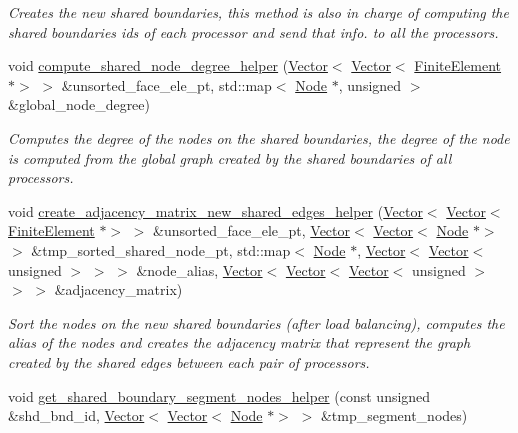 \begin{DoxyCompactItemize}
\begin{DoxyCompactList}\small\item\em Creates the new shared boundaries, this method is also in charge of computing the shared boundaries ids of each processor and send that info. to all the processors. \end{DoxyCompactList}\item 
void \hyperlink{classoomph_1_1RefineableTriangleMesh_a4c2c3ff989c57ac84bbc9a8b5fb1db26}{compute\+\_\+shared\+\_\+node\+\_\+degree\+\_\+helper} (\hyperlink{classoomph_1_1Vector}{Vector}$<$ \hyperlink{classoomph_1_1Vector}{Vector}$<$ \hyperlink{classoomph_1_1FiniteElement}{Finite\+Element} $\ast$$>$ $>$ \&unsorted\+\_\+face\+\_\+ele\+\_\+pt, std\+::map$<$ \hyperlink{classoomph_1_1Node}{Node} $\ast$, unsigned $>$ \&global\+\_\+node\+\_\+degree)
\begin{DoxyCompactList}\small\item\em Computes the degree of the nodes on the shared boundaries, the degree of the node is computed from the global graph created by the shared boundaries of all processors. \end{DoxyCompactList}\item 
void \hyperlink{classoomph_1_1RefineableTriangleMesh_a9a7862f1bcea07095590070bbc0305a7}{create\+\_\+adjacency\+\_\+matrix\+\_\+new\+\_\+shared\+\_\+edges\+\_\+helper} (\hyperlink{classoomph_1_1Vector}{Vector}$<$ \hyperlink{classoomph_1_1Vector}{Vector}$<$ \hyperlink{classoomph_1_1FiniteElement}{Finite\+Element} $\ast$$>$ $>$ \&unsorted\+\_\+face\+\_\+ele\+\_\+pt, \hyperlink{classoomph_1_1Vector}{Vector}$<$ \hyperlink{classoomph_1_1Vector}{Vector}$<$ \hyperlink{classoomph_1_1Node}{Node} $\ast$$>$ $>$ \&tmp\+\_\+sorted\+\_\+shared\+\_\+node\+\_\+pt, std\+::map$<$ \hyperlink{classoomph_1_1Node}{Node} $\ast$, \hyperlink{classoomph_1_1Vector}{Vector}$<$ \hyperlink{classoomph_1_1Vector}{Vector}$<$ unsigned $>$ $>$ $>$ \&node\+\_\+alias, \hyperlink{classoomph_1_1Vector}{Vector}$<$ \hyperlink{classoomph_1_1Vector}{Vector}$<$ \hyperlink{classoomph_1_1Vector}{Vector}$<$ unsigned $>$ $>$ $>$ \&adjacency\+\_\+matrix)
\begin{DoxyCompactList}\small\item\em Sort the nodes on the new shared boundaries (after load balancing), computes the alias of the nodes and creates the adjacency matrix that represent the graph created by the shared edges between each pair of processors. \end{DoxyCompactList}\item 
void \hyperlink{classoomph_1_1RefineableTriangleMesh_ab0a063a42df73f4c5bac4c120aa400d4}{get\+\_\+shared\+\_\+boundary\+\_\+segment\+\_\+nodes\+\_\+helper} (const unsigned \&shd\+\_\+bnd\+\_\+id, \hyperlink{classoomph_1_1Vector}{Vector}$<$ \hyperlink{classoomph_1_1Vector}{Vector}$<$ \hyperlink{classoomph_1_1Node}{Node} $\ast$$>$ $>$ \&tmp\+\_\+segment\+\_\+nodes)

\end{DoxyCompactItemize}

